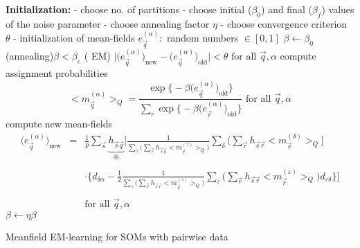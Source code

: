 \begin{algorithm}
\DontPrintSemicolon
\textbf{Initialization:} \;
- choose no. of partitions\;
- choose initial  ($\beta_0$) and final ($\beta_f$) values of the noise parameter\;
- choose annealing factor  $\eta$\;
- choose convergence criterion  $\theta$\;
- initialization of mean-fields  $e_{\vec q}^{(\alpha)}:$ random numbers  $\in [0, 1]$ \;
$\beta \leftarrow \beta_0$\;
\While(annealing){$\beta < \beta_e$}{
\Repeat( EM){ $\big| \big( e_{\vec{q}}^{(\alpha)} \big)_{\mathrm{new}} - \big( e_{\vec{q}}^{(\alpha)} \big)_{\mathrm{old}} \big| < \theta \text{ for all } \vec{q}, \alpha$}{
compute assignment probabilities
\[ \big< m_{\vec{q}}^{(\alpha)} \big>_Q = \frac{ \exp \big\{ -\beta
	\big( e_{\vec{q}}^{(\alpha)} \big)_{\mathrm{old}} \big\}}{
		\sum\limits_r \exp \big\{ -\beta \big( e_{\vec{r}}^{(\alpha)}
		\big)_{\mathrm{old}} \big\} }
	\text{ for all } \vec{q}, \alpha
\]
compute new mean-fields
\[ \begin{array}{lll}
	\big( e_{\vec{q}}^{(\alpha)} \big)_{\mathrm{new}}
	& = &\frac{1}{p} \sum\limits_{\vec{s}} 
		\underbrace{ h_{\vec{s} \vec{q}} }_{ \circledast }
		\Bigg[
		\frac{1}{\sum\limits_{\gamma} \Big( \sum\limits_{\vec{r}}
		h_{\vec{s} \vec{q}} \big< m_{\vec{r}}^{(\gamma)} \big>_Q \Big)}
		\sum\limits_{\delta} \bigg( \sum\limits_{\vec{r}} 
		h_{\vec{s} \vec{r}} \big< m_{\vec{r}}^{(\delta)} \big>_Q \bigg]
		\\\\
	&& \cdot \bigg\{ d_{\delta \alpha} -\frac{1}{2} \frac{1}{
		\sum\limits_{\gamma} \Big( \sum\limits_{\vec{r}} 
		h_{\vec{s} \vec{r}} \big< m_{\vec{r}}^{(\gamma)} \big>_Q \Big)}
		\sum\limits_{\varepsilon} \bigg( \sum\limits_{\vec{r}}
		h_{\vec{s} \vec{r}} \big< m_{\vec{r}}^{(\varepsilon)}
		\big>_Q \bigg) d_{\varepsilon \delta} \bigg\} \Bigg]
		\\\\
	&& \text{for all } \vec{q}, \alpha
\end{array} \]
}
$\beta \leftarrow \eta \beta$\;
}
\label{alg:pairwiseMeanFieldSom}
\caption{Meanfield EM-learning for SOMs with pairwise data}
\end{algorithm}

